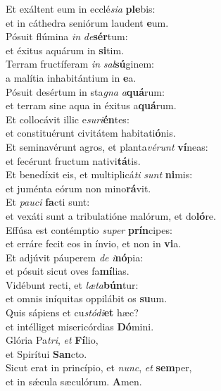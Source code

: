 \evenverse Et exáltent eum in ecclé\textit{si}\textit{a} \textbf{ple}bis:~\*\\
\evenverse et in cáthedra seniórum laudent \textbf{e}um.\\
\oddverse Pósuit flúmina \textit{in} \textit{de}\textbf{sér}tum:~\*\\
\oddverse et éxitus aquárum in \textbf{si}tim.\\
\evenverse Terram fructíferam \textit{in} \textit{sal}\textbf{sú}ginem:~\*\\
\evenverse a malítia inhabitántium in \textbf{e}a.\\
\oddverse Pósuit desértum in sta\textit{gna} \textit{a}\textbf{quá}rum:~\*\\
\oddverse et terram sine aqua in éxitus a\textbf{quá}rum.\\
\evenverse Et collocávit illic e\textit{su}\textit{ri}\textbf{én}tes:~\*\\
\evenverse et constituérunt civitátem habitati\textbf{ó}nis.\\
\oddverse Et seminavérunt agros, et planta\textit{vé}\textit{runt} \textbf{ví}neas:~\*\\
\oddverse et fecérunt fructum nativi\textbf{tá}tis.\\
\evenverse Et benedíxit eis, et multiplicá\textit{ti} \textit{sunt} \textbf{ni}mis:~\*\\
\evenverse et juménta eórum non mino\textbf{rá}vit.\\
\oddverse Et \textit{pau}\textit{ci} \textbf{fa}cti sunt:~\*\\
\oddverse et vexáti sunt a tribulatióne malórum, et do\textbf{ló}re.\\
\evenverse Effúsa est contémptio \textit{su}\textit{per} \textbf{prín}cipes:~\*\\
\evenverse et erráre fecit eos in ínvio, et non in \textbf{vi}a.\\
\oddverse Et adjúvit páuperem \textit{de} \textit{i}\textbf{nó}pia:~\*\\
\oddverse et pósuit sicut oves fa\textbf{mí}lias.\\
\evenverse Vidébunt recti, et \textit{læ}\textit{ta}\textbf{bún}tur:~\*\\
\evenverse et omnis iníquitas oppilábit os \textbf{su}um.\\
\oddverse Quis sápiens et cu\textit{stó}\textit{di}\textbf{et} hæc?~\*\\
\oddverse et intélliget misericórdias \textbf{Dó}mini.\\
\evenverse Glória Pa\textit{tri}, \textit{et} \textbf{Fí}lio,~\*\\
\evenverse et Spirítui \textbf{San}cto.\\
\oddverse Sicut erat in princípio, et \textit{nunc}, \textit{et} \textbf{sem}per,~\*\\
\oddverse et in sǽcula sæculórum. \textbf{A}men.\\
